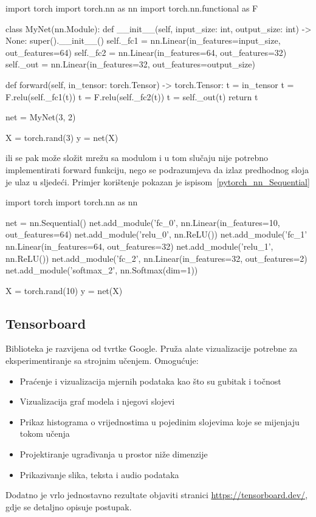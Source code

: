 \begin{python}[caption={Nasljeđivanje PyTorch torch.nn.Module}, label={pytorch_nn_Module}]
import torch
import torch.nn as nn
import torch.nn.functional as F

class MyNet(nn.Module):
    def __init__(self, input_size: int, output_size: int) -> None:
        super().__init__()
        self._fc1 = nn.Linear(in_features=input_size, out_features=64)
        self._fc2 = nn.Linear(in_features=64, out_features=32)
        self._out = nn.Linear(in_features=32, out_features=output_size)
		
    def forward(self, in_tensor: torch.Tensor) -> torch.Tensor:
        t = in_tensor
        t = F.relu(self._fc1(t))
        t = F.relu(self._fc2(t))
        t = self._out(t)
        return t


net = MyNet(3, 2)

X = torch.rand(3)
y = net(X)
\end{python}

ili se pak može složit mrežu sa  modulom i u tom slučaju nije potrebno implementirati forward funkciju, nego se podrazumjeva da izlaz predhodnog sloja je ulaz u sljedeći. Primjer korištenje  pokazan je ispisom~\ref{pytorch_nn_Sequential}

\begin{python}[caption={Korištenje PyTorch torch.nn.Sequential}, label=pytorch_nn_Sequential]
import torch
import torch.nn as nn

net = nn.Sequential()
net.add_module('fc_0', nn.Linear(in_features=10, out_features=64)
net.add_module('relu_0', nn.ReLU())
net.add_module('fc_1' nn.Linear(in_features=64, out_features=32)
net.add_module('relu_1', nn.ReLU())
net.add_module('fc_2', nn.Linear(in_features=32, out_features=2)
net.add_module('softmax_2', nn.Softmax(dim=1))

X = torch.rand(10)
y = net(X)
\end{python}

\subsection{Tensorboard}
Biblioteka je razvijena od tvrtke Google. Pruža alate vizualizacije potrebne za eksperimentiranje sa strojnim učenjem. 
Omogućuje:
\begin{itemize}
	\item Praćenje i vizualizacija mjernih podataka kao što su gubitak i točnost
	\item Vizualizacija graf modela i njegovi slojevi
	\item Prikaz histograma o vrijednostima u pojedinim slojevima koje se mijenjaju tokom učenja
	\item Projektiranje ugrađivanja u prostor niže dimenzije
	\item Prikazivanje slika, teksta i audio podataka
\end{itemize}
Dodatno je vrlo jednostavno rezultate objaviti stranici \url{https://tensorboard.dev/}, gdje se detaljno opisuje postupak.

